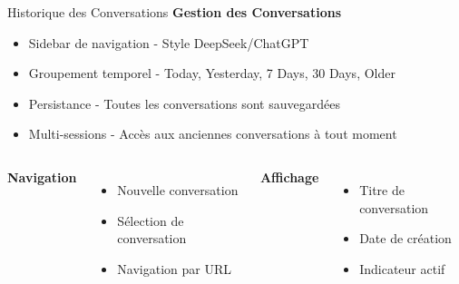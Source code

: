 \documentclass[aspectratio=169]{beamer}
\begin{document}
\begin{frame}{Historique des Conversations}
    \textbf{Gestion des Conversations}
    \begin{itemize}
        \item \textcolor{primaryblue}{Sidebar de navigation} - Style DeepSeek/ChatGPT
        \item \textcolor{primaryblue}{Groupement temporel} - Today, Yesterday, 7 Days, 30 Days, Older
        \item \textcolor{primaryblue}{Persistance} - Toutes les conversations sont sauvegardées
        \item \textcolor{primaryblue}{Multi-sessions} - Accès aux anciennes conversations à tout moment
    \end{itemize}
    
    \vspace{0.5cm}
    
    \begin{columns}
        \textbf{Navigation}
        \begin{itemize}
            \item Nouvelle conversation
            \item Sélection de conversation
            \item Navigation par URL
        \end{itemize}
        
        \textbf{Affichage}
        \begin{itemize}
            \item Titre de conversation
            \item Date de création
            \item Indicateur actif
        \end{itemize}
    \end{columns}
\end{frame}
\end{document}
